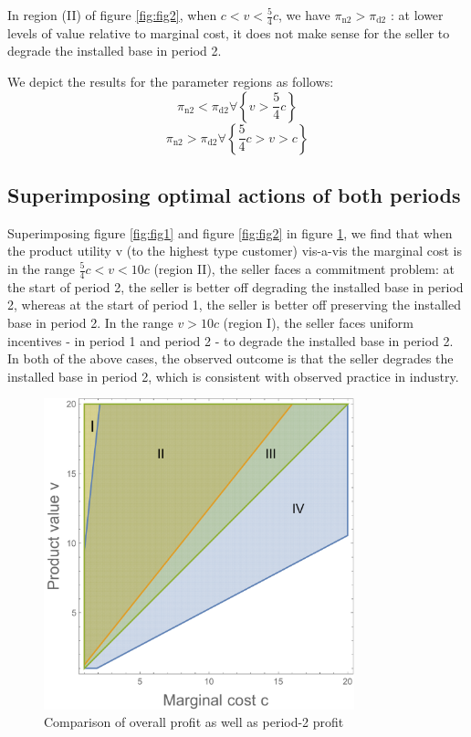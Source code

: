 \documentclass[isre,blindrev]{informs3} %
\begin{document}
In region (II) of figure \ref{fig:fig2}, when \(c<v<\frac{5}{4}c\), we have \(\pi _{\text{n2}}>\pi _{\text{d2}}\) : at lower levels of value relative to
marginal cost, it does not make sense for the seller to degrade the installed base in period 2. 

We depict the results for the parameter regions as follows:
\begin{equation}
\pi _{\text{n2}}<\pi _{\text{d2}} \forall \left\{v > \frac{5}{4}c \right\}
\end{equation}
\begin{equation}
\pi _{\text{n2}}>\pi _{\text{d2}} \forall \left\{\frac{5}{4}c>v > c \right\}
\end{equation}
\subsection{Superimposing optimal actions of both periods}
\label{no-innovate-superimpose}
Superimposing figure \ref{fig:fig1} and figure \ref{fig:fig2} in figure \ref{fig:fig3}, we find that when the product utility v (to the highest type customer) vis-a-vis the marginal cost is in the range
\(\frac{5}{4}c<v<10c\) (region II), the seller faces a commitment problem: at the start of period 2, the seller is { }better off degrading the installed base
in period 2, whereas at the start of period 1, the seller is better off preserving the installed base in period 2. In the range \(v>10c\) (region I), the seller
faces uniform incentives - in period 1 and period 2 - to degrade the installed base in period 2. In both of the above cases, the observed outcome
is that the seller degrades the installed base in period 2, which is consistent with observed practice in industry.

\begin{figure}[htp]
    \centering
    \includegraphics[width=9cm]{2020_05_19-overleaf-mirror_gr3.pdf}
    \caption{Comparison of overall profit as well as period-2 profit}
    \label{fig:fig3}
\end{figure}
\end{document}
